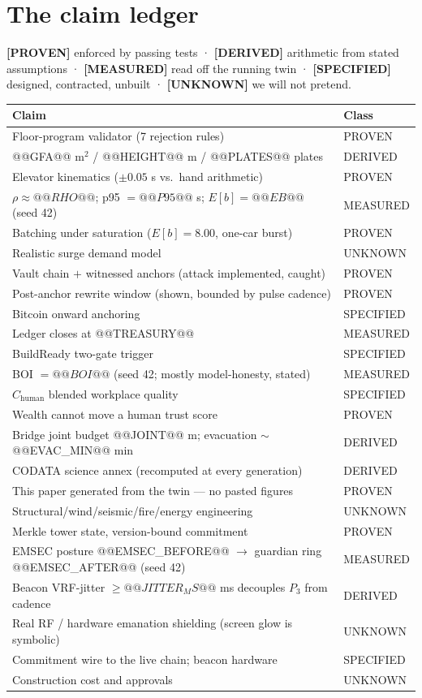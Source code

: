 \documentclass[11pt,a4paper]{article}
\newcommand{\uqug}{\text{\textmu QUG}}
\newcommand{\claim}[1]{\textcolor{qsteel}{\textbf{\footnotesize[#1]}}}
\begin{document}
\section{The claim ledger}

\claim{PROVEN} enforced by passing tests · \claim{DERIVED} arithmetic from
stated assumptions · \claim{MEASURED} read off the running twin ·
\claim{SPECIFIED} designed, contracted, unbuilt · \claim{UNKNOWN} we will not
pretend.

\begin{center}\small
\begin{tabular}{@{}ll@{}}
\toprule
Claim & Class \\
\midrule
Floor-program validator (7 rejection rules) & PROVEN \\
@@GFA@@ m$^2$ / @@HEIGHT@@ m / @@PLATES@@ plates & DERIVED \\
Elevator kinematics ($\pm0.05$ s vs.\ hand arithmetic) & PROVEN \\
$\rho \approx @@RHO@@$; p95 $= @@P95@@$ s; $E[b]=@@EB@@$ (seed 42) & MEASURED \\
Batching under saturation ($E[b]=8.00$, one-car burst) & PROVEN \\
Realistic surge demand model & UNKNOWN \\
Vault chain $+$ witnessed anchors (attack implemented, caught) & PROVEN \\
Post-anchor rewrite window (shown, bounded by pulse cadence) & PROVEN \\
Bitcoin onward anchoring & SPECIFIED \\
Ledger closes at @@TREASURY@@ \uqug{} & MEASURED \\
BuildReady two-gate trigger & SPECIFIED \\
BOI $= @@BOI@@$ (seed 42; mostly model-honesty, stated) & MEASURED \\
$C_{\text{human}}$ blended workplace quality & SPECIFIED \\
Wealth cannot move a human trust score & PROVEN \\
Bridge joint budget @@JOINT@@ m; evacuation $\sim$@@EVAC_MIN@@ min & DERIVED \\
CODATA science annex (recomputed at every generation) & DERIVED \\
This paper generated from the twin --- no pasted figures & PROVEN \\
Structural/wind/seismic/fire/energy engineering & UNKNOWN \\
Merkle tower state, version-bound commitment & PROVEN \\
EMSEC posture @@EMSEC_BEFORE@@ $\to$ guardian ring @@EMSEC_AFTER@@ (seed 42) & MEASURED \\
Beacon VRF-jitter $\geq @@JITTER_MS@@$ ms decouples $P_3$ from cadence & DERIVED \\
Real RF / hardware emanation shielding (screen glow is symbolic) & UNKNOWN \\
Commitment wire to the live chain; beacon hardware & SPECIFIED \\
Construction cost and approvals & UNKNOWN \\
\bottomrule
\end{tabular}
\end{center}
\end{document}
